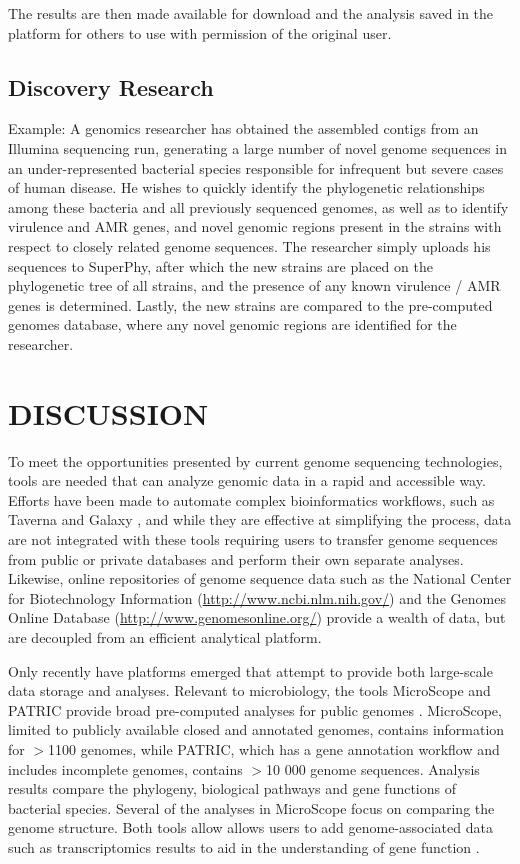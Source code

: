 \documentclass[a4paper,twoside]{article}
\begin{document}
The results are then made available for download and the analysis saved in the platform for others to use with permission of the original user.

\subsection{Discovery Research}
Example: A genomics researcher has obtained the assembled contigs from an Illumina sequencing run, generating a large number of novel genome sequences in an under-represented bacterial species responsible for infrequent but severe cases of human disease. He wishes to quickly identify the phylogenetic relationships among these bacteria and all previously sequenced genomes, as well as to identify virulence and AMR genes, and novel genomic regions present in the strains with respect to closely related genome sequences. The researcher simply uploads his sequences to SuperPhy, after which the new strains are placed on the phylogenetic tree of all strains, and the presence of any known virulence / AMR genes is determined. Lastly, the new strains are compared to the pre-computed genomes database, where any novel genomic regions are identified for the researcher.

\section{\uppercase{Discussion}}
\label{sec:discussion}

To meet the opportunities presented by current genome sequencing technologies, tools are needed that can analyze genomic data in a rapid and accessible way. Efforts have been made to automate complex bioinformatics workflows, such as Taverna \cite{lanzen_taverna_2008} and Galaxy \cite{goecks_galaxy:_2010}, and while they are effective at simplifying the process, data are not integrated with these tools requiring users to transfer genome sequences from public or private databases and perform their own separate analyses. Likewise, online repositories of genome sequence data such as the National Center for Biotechnology Information (\url{http://www.ncbi.nlm.nih.gov/}) and the Genomes Online Database (\url{http://www.genomesonline.org/}) provide a wealth of data, but are decoupled from an efficient analytical platform. 

Only recently have platforms emerged that attempt to provide both large-scale data storage and analyses. Relevant to microbiology, the tools MicroScope and PATRIC provide broad pre-computed analyses for public genomes \cite{vallenet_microscope--integrated_2012,wattam2013}.  MicroScope, limited to publicly available closed and annotated genomes, contains information for $>$1100 genomes, while PATRIC, which has a gene annotation workflow and includes incomplete genomes, contains $>$10 000 genome sequences. Analysis results compare the phylogeny, biological pathways and gene functions of bacterial species. Several of the analyses in MicroScope focus on comparing the genome structure. Both tools allow allows users to add genome-associated data such as transcriptomics results to aid in the understanding of gene function \cite{vallenet_microscope--integrated_2012,wattam2013}. 
\end{document}
